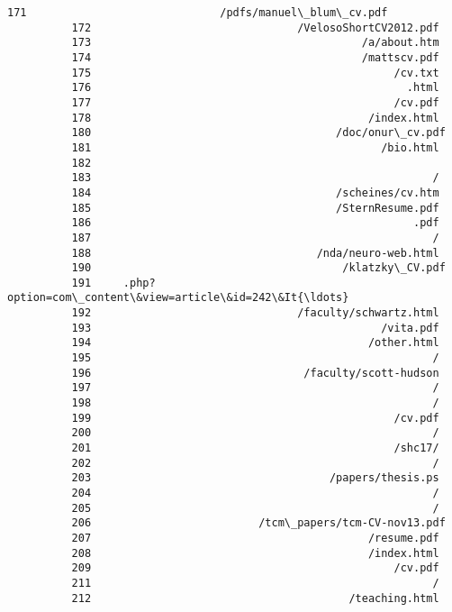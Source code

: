 \documentclass[11pt]{article}
\begin{document}
\begin{Verbatim}[commandchars=\\\{\}]
          171                              /pdfs/manuel\_blum\_cv.pdf
          172                                /VelosoShortCV2012.pdf
          173                                          /a/about.htm
          174                                          /mattscv.pdf
          175                                               /cv.txt
          176                                                 .html
          177                                               /cv.pdf
          178                                           /index.html
          180                                      /doc/onur\_cv.pdf
          181                                             /bio.html
          182                                                      
          183                                                     /
          184                                      /scheines/cv.htm
          185                                      /SternResume.pdf
          186                                                  .pdf
          187                                                     /
          188                                   /nda/neuro-web.html
          190                                       /klatzky\_CV.pdf
          191     .php?option=com\_content\&view=article\&id=242\&It{\ldots}
          192                                /faculty/schwartz.html
          193                                             /vita.pdf
          194                                           /other.html
          195                                                     /
          196                                 /faculty/scott-hudson
          197                                                     /
          198                                                     /
          199                                               /cv.pdf
          200                                                     /
          201                                               /shc17/
          202                                                     /
          203                                     /papers/thesis.ps
          204                                                     /
          205                                                     /
          206                          /tcm\_papers/tcm-CV-nov13.pdf
          207                                           /resume.pdf
          208                                           /index.html
          209                                               /cv.pdf
          211                                                     /
          212                                        /teaching.html

\end{Verbatim}
\end{document}
